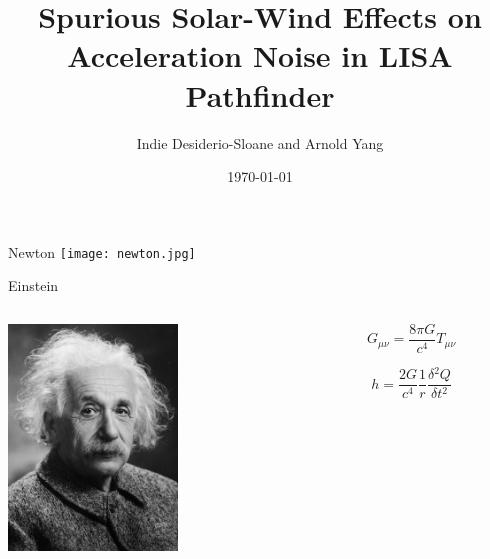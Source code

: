 \documentclass[aspectratio=169,xcolor=dvipsnames]{beamer}
\title[short title]{Spurious Solar-Wind Effects on Acceleration Noise in LISA Pathfinder
} %
\author{Indie Desiderio-Sloane and Arnold Yang}
\institute[NTU] %
{
   Institute for Computing in Research
}
\date{\today} %
\begin{document}
\begin{frame}
    \titlepage
\end{frame}
\begin{frame}{Newton}
    \centering
    \texttt{[image: newton.jpg]}
\end{frame}
\begin{frame}{Einstein}
    \begin{columns}[t]
    \begin{column}{3cm}

    \includegraphics[height=6cm]{einstein.jpg}

    \end{column}
    \begin{column}{5cm}
    \begin{varblock}
    \Huge\[G_{\mu\nu}=\frac{8\pi G}{c{^4}}T_{\mu\nu}\]
    \end{varblock}

    \begin{varblock}
    \Huge\[h=\frac{2G}{c{^4}}\frac{1}{r}\frac{\delta{^2}Q}{\delta t{^2}}\]
    \end{varblock}
    \end{column}
    \end{columns}


\end{frame}
\end{document}
